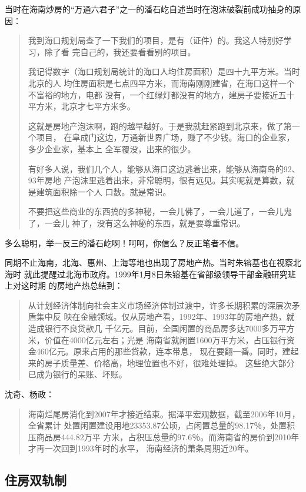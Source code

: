 当时在海南炒房的“万通六君子”之一的潘石屹自述当时在泡沫破裂前成功抽身的原因：
\begin{quotation}
  我到海口规划局查了一下我们的项目，是有（证件）的。我这人特别好学习，除了看
  完自己的，我还要看看别的项目。

  我记得数字（海口规划局统计的海口人均住房面积）是四十九平方米。当时北京的人
  均住房面积是七点四平方米，而海南刚刚建省，在海口这样一个不富裕的地方，电都
  没有，一个红绿灯都没有的地方，建房子要接近五十平方米，北京才七平方米多。

  这就是房地产泡沫啊，跑的越早越好。于是我就赶紧跑到北京来，做了第一个项目，
  在阜成门这边，万通新世界广场，赚了不少钱。海口的企业家，多少企业家，基本上
  全军覆没，出来的很少。

  有好多人说，我们几个人，能够从海口这边逃着出来，能够从海南岛的92、93年房地
  产泡沫里逃着出来，非常聪明，很有远见。其实呢就是算数，就是建筑面积除一个人
  口数。就是常识。

  不要把这些商业的东西搞的多神秘，一会儿佛了，一会儿道了，一会儿鬼了，一会儿
  神了，没有这么神秘的东西，就是要尊重常识。
\end{quotation}

多么聪明，举一反三的潘石屹啊！呵呵，你信么？反正笔者不信。


同期不止海南，北海、惠州、上海等地也出现了房地产热。当时朱镕基也在视察北海时
就此提醒过北海市政府。1999年1月8日朱镕基在省部级领导干部金融研究班上对这时期
的房地产热总结到：
\begin{quotation}
  从计划经济体制向社会主义市场经济体制过渡中，许多长期积累的深层次矛盾集中反
  映在金融领域。仅从房地产看，1992年、1993年的房地产热，就造成银行不良贷款几
  千亿元。目前，全国闲置的商品房多达7000多万平方米，价值在4000亿元左右；光是
  海南省就闲置1600万平方米，占压银行资金460亿元。原来占用的那些贷款，连本带息，
  现在要翻一番。同时，建起来的房子质量差、价格高，地理位置也不好，很难处理掉。
  这些绝大部分已成为银行的呆账、坏账。
\end{quotation}

沈奇、杨政：
\begin{quotation}
  海南烂尾房消化到2007年才接近结束。据泽平宏观数据，截至2006年10月，全省累计
  处置闲置建设用地23353.87公顷，占闲置总量的98.17％，处置积压商品房444.82万平
  方米，占积压总量的97.6％。而海南省的房价到2010年才再一次回到1993年时的水平，
  海南经济的萧条周期近20年。
\end{quotation}


\subsection{住房双轨制}
\label{sec:tudijnrong}


